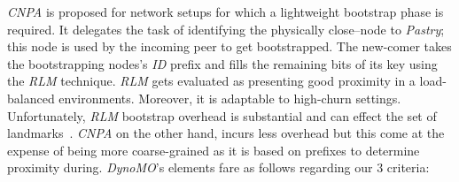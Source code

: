 \emph{CNPA} is proposed for network setups for which a lightweight
bootstrap phase is required.
It delegates the task of identifying the physically
close--node to \emph{Pastry}; this node is used by the 
incoming peer to get bootstrapped.
The new-comer takes the bootstrapping nodes's \emph{ID} prefix 
and fills the remaining bits of its key using the \emph{RLM} technique.
\emph{RLM} gets evaluated as presenting good proximity in a load-balanced 
environments. Moreover, it is adaptable to high-churn settings.
Unfortunately, \emph{RLM} bootstrap overhead is substantial and can 
effect the set of landmarks~\cite{WZS2004}.
\emph{CNPA} on the other hand, incurs less overhead but this come 
at the expense of being more coarse-grained as it is based on prefixes
to determine proximity during.
%
%
%
\emph{DynoMO}'s elements fare as follows regarding our $3$ criteria:

